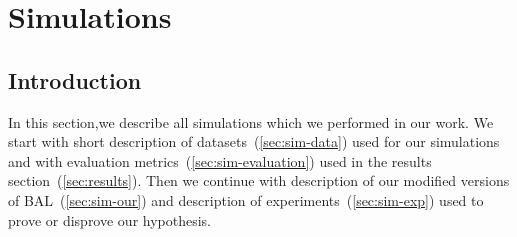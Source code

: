 
\section{Simulations}
\label{sec:simulations} 

\subsection*{Introduction} 
In this section,we describe all simulations which we performed in our work. We start with short description of datasets~(\ref{sec:sim-data}) used for our simulations and with evaluation metrics~(\ref{sec:sim-evaluation}) used in the results section~(\ref{sec:results}). Then we continue with description of our modified versions of BAL~(\ref{sec:sim-our}) and description of experiments~(\ref{sec:sim-exp}) used to prove or disprove our hypothesis. 



 

 

 
